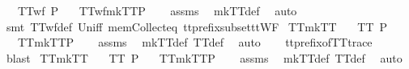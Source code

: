 \begin{isabellebody}
\ \ \ {\isachardoublequoteopen}TTwf\ P{\isachardoublequoteclose}\isanewline
\ \ \ {\isachardoublequoteopen}TTwf{\isacharparenleft}mkTT{}{\isacharparenleft}P{\isacharparenright}{\isacharparenright}{\isachardoublequoteclose}\isanewline
%
\isadelimproof
\ \ %
\endisadelimproof
%
\isatagproof
{}\isamarkupfalse%
\ assms\ \isamarkupfalse%
\ mkTT{}{\isacharunderscore}def\ \isamarkupfalse%
\ auto\isanewline
\ \ \isamarkupfalse%
\ {\isacharparenleft}smt\ TTwf{\isacharunderscore}def\ Un{\isacharunderscore}iff\ mem{\isacharunderscore}Collect{\isacharunderscore}eq\ tt{\isacharunderscore}prefix{\isacharunderscore}subset{\isacharunderscore}ttWF{\isacharparenright}%
\endisatagproof
{\isafoldproof}%
%
\isadelimproof
\isanewline
%
\endisadelimproof
\isanewline
{}\isamarkupfalse%
\ TT{}{\isacharunderscore}mkTT{}{\isacharcolon}\isanewline
\ \ \ {\isachardoublequoteopen}TT{}\ P{\isachardoublequoteclose}\isanewline
\ \ \ {\isachardoublequoteopen}TT{}{\isacharparenleft}mkTT{}{\isacharparenleft}P{\isacharparenright}{\isacharparenright}{\isachardoublequoteclose}\isanewline
%
\isadelimproof
\ \ %
\endisadelimproof
%
\isatagproof
{}\isamarkupfalse%
\ assms\ \isamarkupfalse%
\ mkTT{}{\isacharunderscore}def\ TT{}{\isacharunderscore}def\ \isamarkupfalse%
\ auto\isanewline
\ \ \isamarkupfalse%
\ tt{\isacharunderscore}prefix{\isacharunderscore}of{\isacharunderscore}TT{}{\isacharunderscore}trace\ \isamarkupfalse%
\ blast%
\endisatagproof
{\isafoldproof}%
%
\isadelimproof
\isanewline
%
\endisadelimproof
\isanewline
{}\isamarkupfalse%
\ TT{}{\isacharunderscore}mkTT{}{\isacharcolon}\isanewline
\ \ \ {\isachardoublequoteopen}TT{}\ P{\isachardoublequoteclose}\isanewline
\ \ \ {\isachardoublequoteopen}TT{}{\isacharparenleft}mkTT{}{\isacharparenleft}P{\isacharparenright}{\isacharparenright}{\isachardoublequoteclose}\isanewline
%
\isadelimproof
\ \ %
\endisadelimproof
%
\isatagproof
{}\isamarkupfalse%
\ assms\ \isamarkupfalse%
\ mkTT{}{\isacharunderscore}def\ TT{}{\isacharunderscore}def\ \isamarkupfalse%
\ auto\isanewline
\ \ \isamarkupfalse%

\end{isabellebody}
